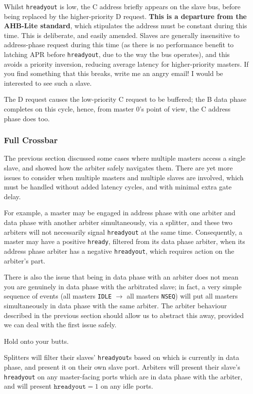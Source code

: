 \documentclass[notitlepage]{article}
\begin{document}
Whilst \texttt{hreadyout} is low, the C address briefly appears on the slave bus, before being replaced by the higher-priority D request. \textbf{This is a departure from the AHB-Lite standard}, which stipulates the address must be constant during this time. This is deliberate, and easily amended. Slaves are generally insensitive to address-phase request during this time (as there is no performance benefit to latching APR before \texttt{hreadyout}, due to the way the bus operates), and this avoids a priority inversion, reducing average latency for higher-priority masters. If you find something that this breaks, write me an angry email! I would be interested to see such a slave.

The D request causes the low-priority C request to be buffered; the B data phase completes on this cycle, hence, from master 0's point of view, the C address phase does too.

\subsubsection{Full Crossbar}

The previous section discussed some cases where multiple masters access a single slave, and showed how the arbiter safely navigates them. There are yet more issues to consider when multiple masters and multiple slaves are involved, which must be handled without added latency cycles, and with minimal extra gate delay.

For example, a master may be engaged in address phase with one arbiter and data phase with another arbiter simultaneously, via a splitter, and these two arbiters will not necessarily signal \texttt{hreadyout} at the same time. Consequently, a master may have a positive \texttt{hready}, filtered from its data phase arbiter, when its address phase arbiter has a negative \texttt{hreadyout}, which requires action on the arbiter's part.

There is also the issue that being in data phase with an arbiter does not mean you are genuinely in data phase with the arbitrated slave; in fact, a very simple sequence of events (all masters \texttt{IDLE} $\to$ all masters \texttt{NSEQ}) will put all masters simultaneously in data phase with the same arbiter. The arbiter behaviour described in the previous section should allow us to abstract this away, provided we can deal with the first issue safely.

Hold onto your butts.

Splitters will filter their slaves' \texttt{hreadyout}s based on which is currently in data phase, and present it on their own slave port. Arbiters will present their slave's \texttt{hreadyout} on any master-facing ports which are in data phase with the arbiter, and will present $\texttt{hreadyout} = 1$ on any idle ports.
\end{document}

